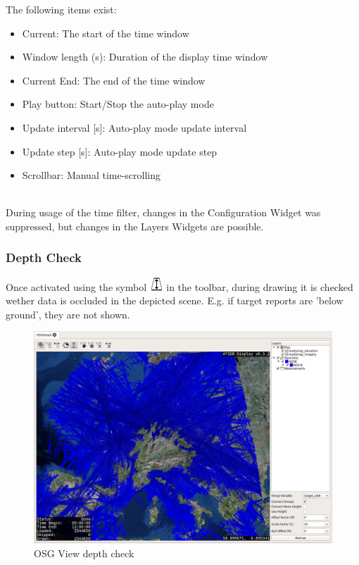 The following items exist:

\begin{itemize}
 \item Current: The start of the time window
 \item Window length (s): Duration of the display time window
 \item Current End: The end of the time window
 \item Play button: Start/Stop the auto-play mode
 \item Update interval [s]: Auto-play mode update interval
 \item Update step [s]: Auto-play mode update step
 \item Scrollbar: Manual time-scrolling
\end{itemize}
\ \\

During usage of the time filter, changes in the Configuration Widget was suppressed, but changes in the Layers Widgets are possible.

\subsubsection{Depth Check}

Once activated using the symbol \includegraphics[width=0.5cm,frame]{../../data/icons/depth.png} in the toolbar, during drawing it is checked wether data is occluded in the depicted scene. E.g. if target reports are 'below ground', they are not shown.

\begin{figure}[H]
    \hspace*{-2cm}
    \includegraphics[width=18cm,frame]{../screenshots/osgview_depth_check.png}
  \caption{OSG View depth check}
\end{figure}

